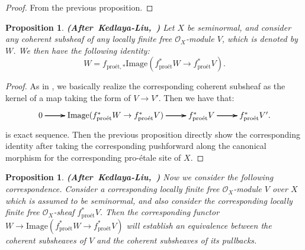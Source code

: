 \documentclass[12pt]{amsart}
\newtheorem{proposition}[theorem]{Proposition}
\theoremstyle{definition}
\numberwithin{equation}{section}
\begin{document}
\begin{proof}
From the previous proposition.	
\end{proof}


\begin{proposition}\mbox{\bf{(After Kedlaya-Liu, \cite[Lemma 8.2.7]{KL16})}}
Let $X$ be seminormal, and consider any coherent subsheaf of any locally finite free $\mathcal{O}_X$-module $V$, which is denoted by $W$. We then have the following identity:
\begin{displaymath}
W=f_{\text{pro\'et},*}\mathrm{Image}(f^*_{\text{pro\'et}}W\rightarrow f^*_{\text{pro\'et}}V).	
\end{displaymath}
\end{proposition}

\begin{proof}
As in \cite[Lemma 8.2.7]{KL16}, we basically realize the corresponding coherent subsheaf as the kernel of a map taking the form of $V\rightarrow V'$. Then we have that:
\[
\xymatrix@R+0pc@C+0pc{
0\ar[r] \ar[r] \ar[r] &\mathrm{Image}(f^*_{\text{pro\'et}}W\rightarrow f^*_{\text{pro\'et}}V)    \ar[r] \ar[r] \ar[r]  &f^*_{\text{pro\'et}}V \ar[r] \ar[r] \ar[r] & f^*_{\text{pro\'et}}V'.
}
\]
is exact sequence. Then the previous proposition directly show the corresponding identity after taking the corresponding pushforward along the canonical morphism for the corresponding pro-\'etale site of $X$.
\end{proof}



\begin{proposition}\mbox{\bf{(After Kedlaya-Liu, \cite[Lemma 8.2.8]{KL16})}} Now we consider the following correspondence. Consider a corresponding locally finite free $\mathcal{O}_X$-module $V$ over $X$ which is assumed to be seminormal, and also consider the corresponding locally finite free $\mathcal{O}_X$-sheaf $f^*_{\text{pro\'et}}V$. Then the corresponding functor $W\rightarrow \mathrm{Image}(f^*_{\text{pro\'et}}W\rightarrow f^*_{\text{pro\'et}}V)$ will establish an equivalence between the coherent subsheaves of $V$ and the coherent subsheaves of its pullbacks.
	
\end{proposition}
\end{document}
